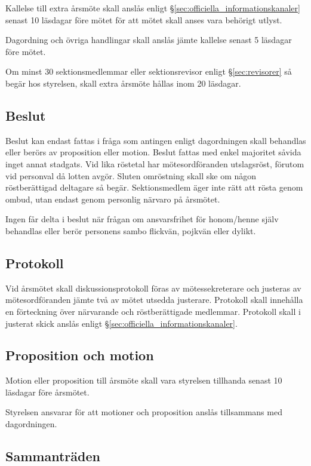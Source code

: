 \documentclass{../resources/dgovdoc}
\begin{document}
Kallelse till extra årsmöte skall anslås enligt
\S\ref{sec:officiella_informationskanaler} senast 10 läsdagar före mötet för att mötet skall anses vara
behörigt utlyst.

Dagordning och övriga handlingar skall anslås jämte kallelse senast
5 läsdagar före mötet.

Om minst 30 sektionsmedlemmar eller sektionsrevisor enligt \S\ref{sec:revisorer} så begär hos styrelsen, skall extra årsmöte hållas inom 20 läsdagar.

\subsection{Beslut}

Beslut kan endast fattas i fråga som antingen enligt dagordningen skall behandlas
eller berörs av proposition eller motion. Beslut fattas med enkel majoritet
såvida inget annat stadgats. Vid lika röstetal har mötesordföranden
utslagsröst, förutom vid personval då lotten avgör. Sluten omröstning skall ske
om någon röstberättigad deltagare så begär. Sektionsmedlem äger inte rätt att rösta genom ombud, utan
endast genom personlig närvaro på årsmötet.

Ingen får delta i beslut när frågan om ansvarsfrihet
för honom/henne själv behandlas eller berör personens sambo flickvän, pojkvän eller dylikt.

\subsection{Protokoll}

Vid årsmötet skall diskussionsprotokoll föras av mötessekreterare och justeras av
mötesordföranden jämte två av mötet utsedda justerare. Protokoll skall
innehålla en förteckning över närvarande och röstberättigade medlemmar. Protokoll
skall i justerat skick anslås enligt \S\ref{sec:officiella_informationskanaler}.

\subsection{Proposition och motion}

Motion eller proposition till årsmöte skall vara styrelsen tillhanda senast 10
läsdagar före årsmötet.

Styrelsen ansvarar för att motioner och proposition anslås tillsammans med dagordningen.

\subsection{Sammanträden}
\end{document}
